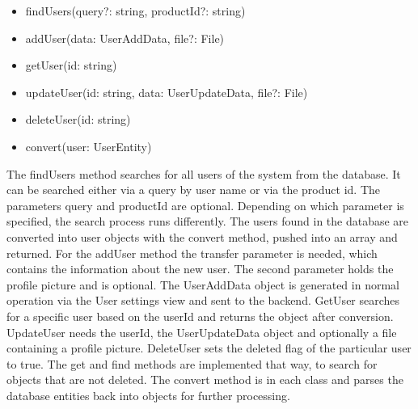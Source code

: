     \begin{itemize}
        \item findUsers(query?: string, productId?: string) 
        \item addUser(data: UserAddData, file?: File)
        \item getUser(id: string)
        \item updateUser(id: string, data: UserUpdateData, file?: File)
        \item deleteUser(id: string)
        \item convert(user: UserEntity)
    \end{itemize}
    The findUsers method searches for all users of the system from the database. It can be searched either via a query by user name or via the product id. The parameters query and productId are optional. Depending on which parameter is specified, the search process runs differently. The users found in the database are converted into user objects with the convert method, pushed into an array and returned. For the addUser method the transfer parameter is needed, which contains the information about the new user. The second parameter holds the profile picture and is optional. The UserAddData object is generated in normal operation via the User settings view and sent to the backend. GetUser searches for a specific user based on the userId and returns the object after conversion. UpdateUser needs the userId, the UserUpdateData object and optionally a file containing a profile picture. DeleteUser sets the deleted flag of the particular user to true. The get and find methods are implemented that way, to search for objects that are not deleted. The convert method is in each class and parses the database entities back into objects for further processing.

